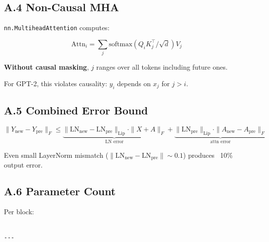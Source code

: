 \subsection{A.4 Non-Causal MHA}

\texttt{nn.MultiheadAttention} computes:

\[
\text{Attn}_i = \sum_j \text{softmax}(Q_i K_j^\top / \sqrt{d}) V_j
\tag{A.6}
\]

\textbf{Without causal masking}, $j$ ranges over all tokens including future ones.

For GPT-2, this violates causality: $y_i$ depends on $x_j$ for $j > i$.

\subsection{A.5 Combined Error Bound}

\[
\|Y_\text{new} - Y_\text{pre}\|_F \leq \underbrace{\|\text{LN}_\text{new} - \text{LN}_\text{pre}\|_\text{Lip} \cdot \|X + A\|_F}_{\text{LN error}} + \underbrace{\|\text{LN}_\text{pre}\|_\text{Lip} \cdot \|A_\text{new} - A_\text{pre}\|_F}_{\text{attn error}}
\tag{A.7}
\]

Even small LayerNorm mismatch ($\|\text{LN}_\text{new} - \text{LN}_\text{pre}\| \sim 0.1$) 
produces ~10\% output error.

\subsection{A.6 Parameter Count}

Per block:

\begin{lstlisting}

---
\end{lstlisting}